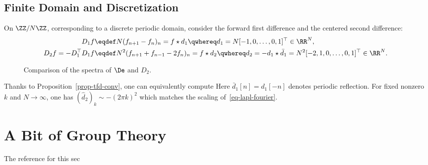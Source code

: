 \subsection{Finite Domain and Discretization}

On $\ZZ/N\ZZ$, corresponding to a discrete periodic domain, consider the forward first difference and the centered second difference:
\begin{align}\label{eq-disc-diff-1}
	D_1 f &\eqdef N(f_{n+1}-f_n)_n=f\star d_1\qwhereq d_1=N[-1,0,\ldots,0,1]^\top \in \RR^N, \\
	\label{eq-disc-diff-2}
	D_2 f=-D_1^\top D_1 f & \eqdef N^2 (f_{n+1}+f_{n-1}-2f_n)_n = f \star d_2 \qwhereq d_2=-d_1\star\bar d_1=N^2[-2,1,0,\ldots,0,1]^\top \in \RR^N.
\end{align}
\begin{figure}[tbp]
\centering
{}
\caption{Comparison of the spectra of $\De$ and $D_2$.}
\label{fig-review-fourier-finite-difference-spectrum}
\end{figure}
Thanks to Proposition~\ref{prop-tfd-conv}, one can equivalently compute
Here $\bar d_1[n]=d_1[-n]$ denotes periodic reflection. For fixed nonzero $k$ and $N\to\infty$, one has $(\hat d_2)_k \sim -(2\pi k)^2$ which matches the scaling of~\eqref{eq-lapl-fourier}.


                                                
                                                
                                                
\section{A Bit of Group Theory}

The reference for this sec